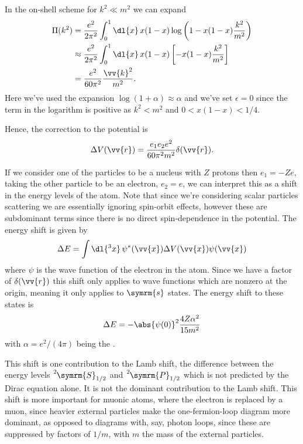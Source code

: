 \documentclass[fleqn]{NotesClass}
\begin{document}
    In the on-shell scheme for \(k^2 \ll m^2\) we can expand
    \begin{align}
        \Pi(k^2) &= \frac{e^2}{2\pi^2} \int_0^1 \dl{x} \, x(1 - x) \log\left( 1 - x(1 - x)\frac{k^2}{m^2} \right)\\
        &\approx \frac{e^2}{2\pi^2} \int_0^1 \dl{x} \, x(1 - x) \left[ -x(1 - x)\frac{k^2}{m^2} \right]\\
        &= \frac{e^2}{60\pi^2} \frac{\vv{k}^2}{m^2}.
    \end{align}
    Here we've used the expansion \(\log(1 + \alpha) \approx \alpha\) and we've set \(\epsilon = 0\) since the term in the logarithm is positive as \(k^2 < m^2\) and \(0 < x(1 - x) < 1/4\).
    
    Hence, the correction to the potential is
    \begin{equation}
        \Delta V(\vv{r}) = \frac{e_1 e_2 e^2}{60\pi^2m^2} \delta(\vv{r}).
    \end{equation}
    
    If we consider one of the particles to be a nucleus with \(Z\) protons then \(e_1 = -Ze\), taking the other particle to be an electron, \(e_2 = e\), we can interpret this as a shift in the energy levels of the atom.
    Note that since we're considering scalar particles scattering we are essentially ignoring spin-orbit effects, however these are subdominant terms since there is no direct spin-dependence in the potential.
    The energy shift is given by
    \begin{equation}
        \Delta E = \int \dl{^3x} \, \psi^*(\vv{x}) \Delta V(\vv{x}) \psi(\vv{x})
    \end{equation}
    where \(\psi\) is the wave function of the electron in the atom.
    Since we have a factor of \(\delta(\vv{r})\) this shift only applies to wave functions which are nonzero at the origin, meaning it only applies to \(\symrm{s}\) states.
    The energy shift to these states is
    \begin{equation}
        \Delta E = -\abs{\psi(0)}^2 \frac{4Z\alpha^2}{15m^2}
    \end{equation}
    with \(\alpha = e^2/(4\pi)\) being the .
    
    This shift is one contribution to the Lamb shift, the difference between the energy levels \(\tensor[^2]{\symrm{S}}{_{1/2}}\) and \(\tensor[^2]{\symrm{P}}{_{1/2}}\) which is  not predicted by the Dirac equation alone.
    It is not the dominant contribution to the Lamb shift.
    This shift is more important for muonic atoms, where the electron is replaced by a muon, since heavier external particles make the one-fermion-loop diagram more dominant, as opposed to diagrams with, say, photon loops, since these are suppressed by factors of \(1/m\), with \(m\) the mass of the external particles.
    
\end{document}
